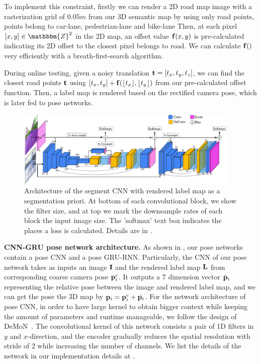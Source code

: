 To implement this constraint, firstly we can render a 2D road map image with a rasterization grid of $0.05m$ from our 3D semantic map by using only road points, \ie points belong to car-lane, pedestrian-lane and bike-lane \etc
Then, at each pixel $[x, y] \in \mathbbm{Z}^2$ in the 2D map, an offset value ${\mathbf f}(x, y)$ is pre-calculated indicating its 2D offset to the closest pixel belongs to road. We can calculate ${\mathbf f}()$ very efficiently with a breath-first-search algorithm.

During online testing, given a noisy translation ${\mathbf t}=[t_x, t_y, t_z]$, we can find the closest road points \wrt ${\mathbf t}$ using $[t_x, t_y] + {\mathbf f}(\lfloor t_x \rfloor, \lfloor t_y \rfloor)$ from our pre-calculated offset function. Then, a label map is rendered based on the rectified camera pose, which is later fed to pose networks.

\begin{figure}[t]
\center
\vspace{-0.6\baselineskip}
\includegraphics[width=0.95\textwidth]{fig/segCNN.pdf}
\caption{Architecture of the segment CNN with rendered label map as a segmentation priori. At bottom of each convolutional block, we show the filter size, and at top we mark the downsample rates of each block \wrt the input image size. The 'softmax' text box indicates the places a loss is calculated. Details are in .}
\label{fig:segnet}
\vspace{-1.2\baselineskip}
\end{figure}
\textbf{CNN-GRU pose network architecture.}
As shown in , our pose networks contain a pose CNN and a pose GRU-RNN. Particularly,
the CNN of our pose network takes as inputs an image ${\mathbf I}$ and the rendered label map ${\mathbf L}$ from corresponding coarse camera pose ${\mathbf p}_i^c$. It outputs a 7 dimension vector $\hat{{\mathbf p}}_i$ representing the relative pose between the image and rendered label map, and we can get the pose \wrt the 3D map by ${\mathbf p}_i = {\mathbf p}_i^c + \hat{{\mathbf p}_i}$.
For the network architecture of pose CNN, in order to have large kernel to obtain bigger context while keeping the amount of parameters and runtime manageable, we follow the design of DeMoN~\cite{ummenhofer2016demon}. The convolutional kernel of this network consists a pair of 1D filters in $y$ and $x$-direction, and the encoder gradually reduces the spatial resolution with stride of 2 while increasing the number of channels. We list the details of the network in our implementation details at .

